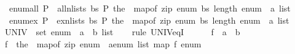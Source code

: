 \begin{isabellebody}
\isanewline
{}\isamarkupfalse%
\isanewline
\ \ {\isachardoublequoteopen}enum{\isacharunderscore}{\kern0pt}all\ P\ {\isacharequal}{\kern0pt}\ all{\isacharunderscore}{\kern0pt}n{\isacharunderscore}{\kern0pt}lists\ {\isacharparenleft}{\kern0pt}{\isasymlambda}bs{\isachardot}{\kern0pt}\ P\ {\isacharparenleft}{\kern0pt}the\ {\isasymcirc}\ map{\isacharunderscore}{\kern0pt}of\ {\isacharparenleft}{\kern0pt}zip\ enum\ bs{\isacharparenright}{\kern0pt}{\isacharparenright}{\kern0pt}{\isacharparenright}{\kern0pt}\ {\isacharparenleft}{\kern0pt}length\ {\isacharparenleft}{\kern0pt}enum\ {\isacharcolon}{\kern0pt}{\isacharcolon}{\kern0pt}\ {\isacharprime}{\kern0pt}a\ list{\isacharparenright}{\kern0pt}{\isacharparenright}{\kern0pt}{\isachardoublequoteclose}\isanewline
\isanewline
{}\isamarkupfalse%
\isanewline
\ \ {\isachardoublequoteopen}enum{\isacharunderscore}{\kern0pt}ex\ P\ {\isacharequal}{\kern0pt}\ ex{\isacharunderscore}{\kern0pt}n{\isacharunderscore}{\kern0pt}lists\ {\isacharparenleft}{\kern0pt}{\isasymlambda}bs{\isachardot}{\kern0pt}\ P\ {\isacharparenleft}{\kern0pt}the\ {\isasymcirc}\ map{\isacharunderscore}{\kern0pt}of\ {\isacharparenleft}{\kern0pt}zip\ enum\ bs{\isacharparenright}{\kern0pt}{\isacharparenright}{\kern0pt}{\isacharparenright}{\kern0pt}\ {\isacharparenleft}{\kern0pt}length\ {\isacharparenleft}{\kern0pt}enum\ {\isacharcolon}{\kern0pt}{\isacharcolon}{\kern0pt}\ {\isacharprime}{\kern0pt}a\ list{\isacharparenright}{\kern0pt}{\isacharparenright}{\kern0pt}{\isachardoublequoteclose}\isanewline
\isanewline
{}\isamarkupfalse%
%
\isadelimproof
\ %
\endisadelimproof
%
\isatagproof
{}\isamarkupfalse%
\isanewline
\ \ \isamarkupfalse%
\ {\isachardoublequoteopen}UNIV\ {\isacharequal}{\kern0pt}\ set\ {\isacharparenleft}{\kern0pt}enum\ {\isacharcolon}{\kern0pt}{\isacharcolon}{\kern0pt}\ {\isacharparenleft}{\kern0pt}{\isacharprime}{\kern0pt}a\ {\isasymRightarrow}\ {\isacharprime}{\kern0pt}b{\isacharparenright}{\kern0pt}\ list{\isacharparenright}{\kern0pt}{\isachardoublequoteclose}\isanewline
\ \ \isamarkupfalse%
\ {\isacharparenleft}{\kern0pt}rule\ UNIV{\isacharunderscore}{\kern0pt}eq{\isacharunderscore}{\kern0pt}I{\isacharparenright}{\kern0pt}\isanewline
\ \ \ \ \isamarkupfalse%
\ f\ {\isacharcolon}{\kern0pt}{\isacharcolon}{\kern0pt}\ {\isachardoublequoteopen}{\isacharprime}{\kern0pt}a\ {\isasymRightarrow}\ {\isacharprime}{\kern0pt}b{\isachardoublequoteclose}\isanewline
\ \ \ \ \isamarkupfalse%
\ {\isachardoublequoteopen}f\ {\isacharequal}{\kern0pt}\ the\ {\isasymcirc}\ map{\isacharunderscore}{\kern0pt}of\ {\isacharparenleft}{\kern0pt}zip\ {\isacharparenleft}{\kern0pt}enum\ {\isacharcolon}{\kern0pt}{\isacharcolon}{\kern0pt}\ {\isacharprime}{\kern0pt}a{\isacharcolon}{\kern0pt}{\isacharcolon}{\kern0pt}enum\ list{\isacharparenright}{\kern0pt}\ {\isacharparenleft}{\kern0pt}map\ f\ enum{\isacharparenright}{\kern0pt}{\isacharparenright}{\kern0pt}{\isachardoublequoteclose}\isanewline

\end{isabellebody}
